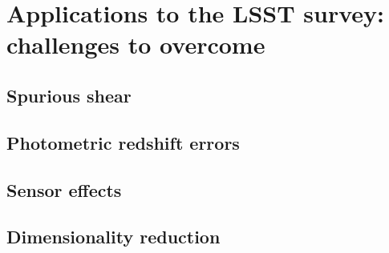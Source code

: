 
\chapter{Applications to the LSST survey: challenges to overcome}
\lhead[\fancyplain{}{\thepage}]{\fancyplain{}{\rightmark}}
 \thispagestyle{plain}
\setlength{\parindent}{10mm}
\label{chp:7}

\section{Spurious shear}
\section{Photometric redshift errors}
\section{Sensor effects}
\section{Dimensionality reduction}

%